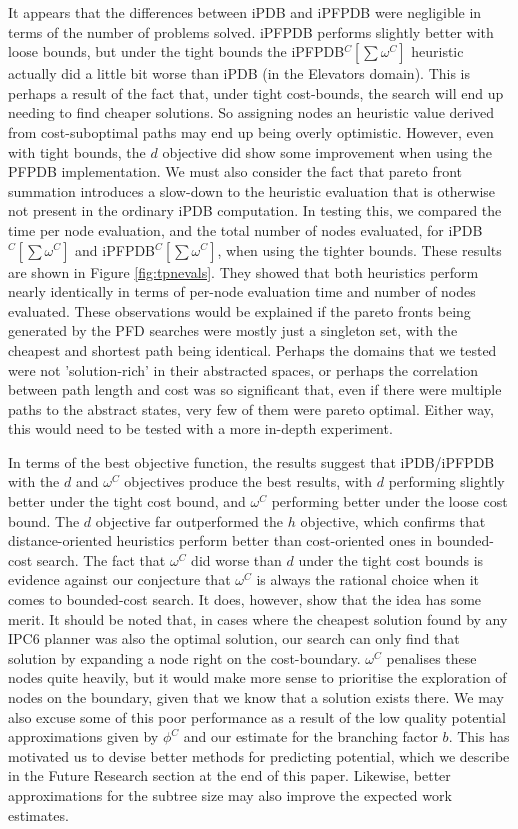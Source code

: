 \documentclass[letterpaper]{article} %
\begin{document}
It appears that the differences between iPDB and iPFPDB were negligible
in terms of the number of problems solved.
iPFPDB performs slightly better with loose bounds,
but under the tight bounds the iPFPDB\(^C[\sum \omega^C]\) heuristic actually did a little bit worse
than iPDB (in the Elevators domain).
This is perhaps a result of the fact that, under tight cost-bounds,
the search will end up needing to find cheaper solutions.
So assigning nodes an heuristic value derived from cost-suboptimal paths may end up
being overly optimistic.
However, even with tight bounds, the \(d\) objective did show some improvement when using the PFPDB implementation.
We must also consider the fact that pareto front
summation introduces a slow-down to the heuristic evaluation that is otherwise not present in the ordinary iPDB computation.
In testing this, we compared the time per node evaluation, and the total number of nodes evaluated, for iPDB\(^C[\sum \omega^C]\) and iPFPDB\(^C[\sum \omega^C]\), when using the tighter bounds.
These results are shown in Figure \ref{fig:tpnevals}.
They showed that both heuristics perform nearly identically in terms of per-node evaluation time
and number of nodes evaluated.
These observations would be explained if
the pareto fronts being generated by the PFD searches were mostly
just a singleton set, with the cheapest and shortest path being identical.
Perhaps the domains that we tested were not 'solution-rich' in their abstracted
spaces, or perhaps the correlation between path length and cost
was so significant that, even if there were multiple paths to the abstract states,
very few of them were pareto optimal.
Either way, this would need to be tested with a more
in-depth experiment.

In terms of the best objective function,
the results suggest that iPDB/iPFPDB with the \(d\) and \(\omega^C\) objectives
produce the best results, with \(d\) performing slightly better under the tight cost bound,
and \(\omega^C\) performing better under the loose cost bound.
The \(d\) objective far outperformed the \(h\) objective, which
confirms that distance-oriented heuristics
perform better than cost-oriented ones in bounded-cost search.
The fact that \(\omega^C\) did worse than \(d\) under the tight cost bounds
is evidence against our conjecture that \(\omega^C\) is always the rational
choice when it comes to bounded-cost search. It does, however, show that
the idea has some merit. It should be noted that,
in cases where the cheapest solution found by any IPC6 planner
was also the optimal solution, our search can only find that solution
by expanding a node right on the cost-boundary. \(\omega^C\) penalises
these nodes quite heavily, but it would make more sense to prioritise the
exploration of nodes on the boundary, given that we know that a solution exists there.
We may also excuse some
of this poor performance as a result of the low quality potential
approximations given by \(\phi^C\) and
our estimate for the branching factor \(b\).
This has motivated us to devise better methods for predicting potential,
which we describe in the Future Research section at the end of this paper.
Likewise, better approximations for the subtree size may also improve the expected
work estimates.
\end{document}
